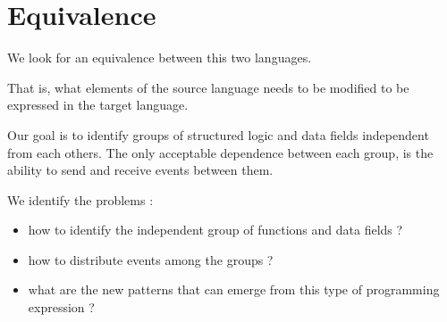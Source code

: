 \section{Equivalence}

We look for an equivalence between this two languages.

That is, what elements of the source language needs to be modified to be expressed in the target language.


Our goal is to identify groups of structured logic and data fields independent from each others.
The only acceptable dependence between each group, is the ability to send and receive events between them.

We identify the problems :
\begin{itemize}
  \item how to identify the independent group of functions and data fields ?
  \item how to distribute events among the groups ?
  \item what are the new patterns that can emerge from this type of programming expression ?
\end{itemize}